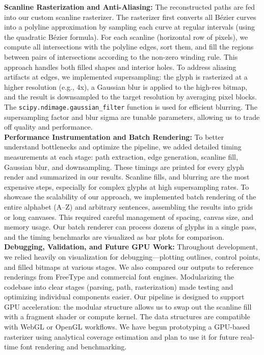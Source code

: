 \documentclass[11pt]{article}
\begin{document}
\textbf{Scanline Rasterization and Anti-Aliasing:} The reconstructed paths are fed into our custom scanline rasterizer. The rasterizer first converts all Bézier curves into a polyline approximation by sampling each curve at regular intervals (using the quadratic Bézier formula). For each scanline (horizontal row of pixels), we compute all intersections with the polyline edges, sort them, and fill the regions between pairs of intersections according to the non-zero winding rule. This approach handles both filled shapes and interior holes. To address aliasing artifacts at edges, we implemented supersampling: the glyph is rasterized at a higher resolution (e.g., 4x), a Gaussian blur is applied to the high-res bitmap, and the result is downsampled to the target resolution by averaging pixel blocks. The \texttt{scipy.ndimage.gaussian\_filter} function is used for efficient blurring. The supersampling factor and blur sigma are tunable parameters, allowing us to trade off quality and performance. \\

\textbf{Performance Instrumentation and Batch Rendering:} To better understand bottlenecks and optimize the pipeline, we added detailed timing measurements at each stage: path extraction, edge generation, scanline fill, Gaussian blur, and downsampling. These timings are printed for every glyph render and summarized in our results. Scanline fills, and blurring are the most expensive steps, especially for complex glyphs at high supersampling rates. To showcase the scalability of our approach, we implemented batch rendering of the entire alphabet (A–Z) and arbitrary sentences, assembling the results into grids or long canvases. This required careful management of spacing, canvas size, and memory usage. Our batch renderer can process dozens of glyphs in a single pass, and the timing benchmarks are visualized as bar plots for comparison. \\

\textbf{Debugging, Validation, and Future GPU Work:} Throughout development, we relied heavily on visualization for debugging---plotting outlines, control points, and filled bitmaps at various stages. We also compared our outputs to reference renderings from FreeType and commercial font engines. Modularizing the codebase into clear stages (parsing, path, rasterization) made testing and optimizing individual components easier. Our pipeline is designed to support GPU acceleration: the modular structure allows us to swap out the scanline fill with a fragment shader or compute kernel. The data structures are compatible with WebGL or OpenGL workflows. We have begun prototyping a GPU-based rasterizer using analytical coverage estimation and plan to use it for future real-time font rendering and benchmarking. \\
\end{document}
